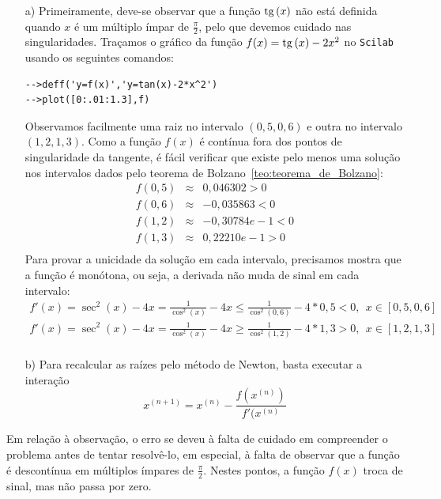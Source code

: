 \begin{resp}
  \begin{itemize}
\item[a)]Primeiramente, deve-se observar que a função $\operatorname{tg}\,(x)$ não está definida quando $x$ é um múltiplo ímpar de $\frac{\pi}{2}$, pelo que devemos cuidado nas singularidades. Traçamos o gráfico da função $f(x)=\operatorname{tg}\,(x)-2x^2$ no \verb+Scilab+ usando os seguintes comandos:
\begin{verbatim}
-->deff('y=f(x)','y=tan(x)-2*x^2')
-->plot([0:.01:1.3],f)
\end{verbatim} 
Observamos facilmente uma raiz no intervalo $(0,5, 0,6)$ e outra no intervalo $(1,2, 1,3)$. Como a função $f(x)$ é contínua fora dos pontos de singularidade da tangente, é fácil verificar que existe pelo menos uma solução nos intervalos dados pelo teorema de Bolzano~\ref{teo:teorema_de_Bolzano}:
\begin{eqnarray*}
f(0,5) &\approx& 0,046302 >0\\
f(0,6) &\approx& -0,035863 <0\\
f(1,2) &\approx& -0,30784e-1 <0\\
f(1,3) &\approx&  0,22210e-1>0\\
\end{eqnarray*} 
Para provar a unicidade da solução em cada intervalo, precisamos mostra que a função é monótona, ou seja, a derivada não muda de sinal em cada intervalo:
\begin{eqnarray*}
f'(x)=\sec^2(x)-4x=\frac{1}{\cos^2(x)}-4x\leq \frac{1}{\cos^2(0,6)}-4*0,5<0, ~~x\in[ 0,5, 0,6]\\
f'(x)=\sec^2(x)-4x=\frac{1}{\cos^2(x)}-4x\geq \frac{1}{\cos^2(1,2)}-4*1,3>0, ~~x\in[ 1,2, 1,3]\\
\end{eqnarray*} 



\item[b)] Para recalcular as raízes pelo método de Newton, basta executar a interação
$$x^{(n+1)}=x^{(n)}-\frac{f(x^{(n)})}{f'(x^{(n)}}$$    
\end{itemize}
Em relação à observação, o erro se deveu à falta de cuidado em compreender o problema antes de tentar resolvê-lo, em especial, à falta de observar que a função é descontínua em  múltiplos ímpares de $\frac{\pi}{2}$. Nestes pontos, a função $f(x)$ troca de sinal, mas não passa por zero.    
\end{resp}
\fi


